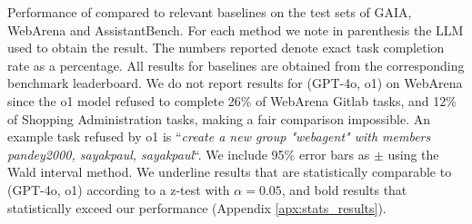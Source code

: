 \begin{table}[h!]
\centering
\caption{Performance of \team compared to relevant baselines on the test sets of GAIA, WebArena and AssistantBench. For each method we note in parenthesis the LLM used to obtain the result. The numbers reported denote exact task completion rate as a percentage. All results for baselines are obtained from the corresponding benchmark leaderboard. We do not report results for \team (GPT-4o, o1) on WebArena since the o1 model refused to complete 26\% of WebArena Gitlab tasks, and 12\% of Shopping Administration tasks, making a fair comparison impossible. An example task refused by o1 is ``\emph{create a new group "webagent" with members pandey2000, sayakpaul, sayakpaul}``. We include 95\% error bars as $\pm$ using the Wald interval method. We underline results that are statistically comparable to \team (GPT-4o, o1) according to a z-test with $\alpha=0.05$, and bold results that statistically exceed our performance (Appendix \ref{apx:stats_results}). 
}



\end{table}
